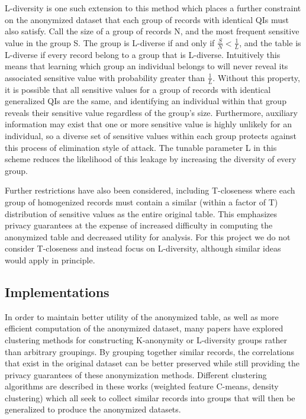 L-diversity\cite{machanavajjhalalDiversity} is one such extension to this method which places a further constraint on the anonymized dataset that each group of records with identical QIs must also satisfy. Call the size of a group of records N, and the most frequent sensitive value in the group S. The group is L-diverse if and only if $\frac{S}{N}<\frac{1}{L}$, and the table is L-diverse if every record belong to a group that is L-diverse. Intuitively this means that learning which group an individual belongs to will never reveal its associated sensitive value with probability greater than $\frac{1}{L}$. Without this property, it is possible that all sensitive values for a group of records with identical generalized QIs are the same, and identifying an individual within that group reveals their sensitive value regardless of the group's size. Furthermore, auxiliary information may exist that one or more sensitive value is highly unlikely for an individual, so a diverse set of sensitive values within each group protects against this process of elimination style of attack. The tunable parameter L in this scheme reduces the likelihood of this leakage by increasing the diversity of every group.

Further restrictions have also been considered, including T-closeness\cite{litCloseness} where each group of homogenized records must contain a similar (within a factor of T) distribution of sensitive values as the entire original table. This emphasizes privacy guarantees at the expense of increased difficulty in computing the anonymized table and decreased utility for analysis. For this project we do not consider T-closeness and instead focus on L-diversity, although similar ideas would apply in principle.

\subsection{Implementations}
In order to maintain better utility of the anonymized table, as well as more efficient computation of the anonymized dataset, many papers have explored clustering methods for constructing K-anonymity or L-diversity groups rather than arbitrary groupings. By grouping together similar records, the correlations that exist in the original dataset can be better preserved while still providing the privacy guarantees of these anonymization methods\cite{niClustering}\cite{liuDensity}\cite{chiuClustering}. Different clustering algorithms are described in these works (weighted feature C-means, density clustering) which all seek to collect similar records into groups that will then be generalized to produce the anonymized datasets.

